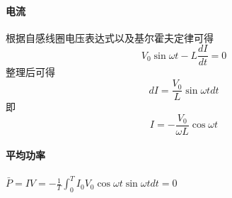 \paragraph{电流} 根据自感线圈电压表达式以及基尔霍夫定律可得
\begin{equation*}
    V_0\sin\omega t-L\frac{dI}{dt}=0
\end{equation*}
整理后可得
\begin{equation*}
    dI=\frac{V_0}{L}\sin\omega tdt
\end{equation*}
即
\begin{equation*}
    I=-\frac{V_0}{\omega L}\cos\omega t
\end{equation*}

\paragraph{平均功率} $\bar{P}=IV=-\frac1T\int_0^TI_0V_0\cos\omega t\sin\omega tdt=0$

